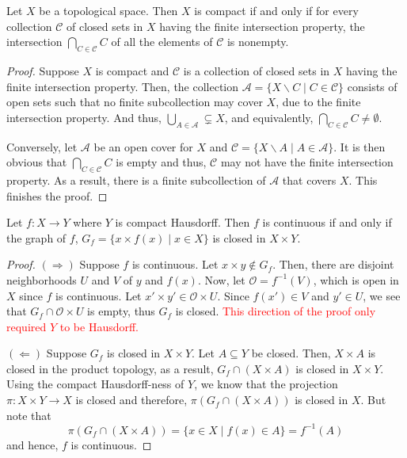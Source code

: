 \begin{theorem}
    Let $X$ be a topological space. Then $X$ is compact if and only if for every collection $\mathscr{C}$ of closed sets in $X$ having the finite intersection property, the intersection $\bigcap_{C\in\mathscr{C}} C$ of all the elements of $\mathscr{C}$ is nonempty.
\end{theorem}
\begin{proof}
    Suppose $X$ is compact and $\mathscr{C}$ is a collection of closed sets in $X$ having the finite intersection property. Then, the collection $\mathscr{A} = \{X\backslash C\mid C\in\mathscr{C}\}$ consists of open sets such that no finite subcollection may cover $X$, due to the finite intersection property. And thus, $\bigcup_{A\in\mathscr{A}}\subsetneq X$, and equivalently, $\bigcap_{C\in\mathscr{C}}C\ne\emptyset$.

    Conversely, let $\mathscr{A}$ be an open cover for $X$ and $\mathscr{C} = \{X\backslash A\mid A\in\mathscr{A}\}$. It is then obvious that $\bigcap_{C\in\mathscr{C}} C$ is empty and thus, $\mathscr{C}$ may not have the finite intersection property. As a result, there is a finite subcollection of $\mathscr{A}$ that covers $X$. This finishes the proof.
\end{proof}

\begin{lemma}
    Let $f: X\to Y$ where $Y$ is compact Hausdorff. Then $f$ is continuous if and only if the graph of $f$, $G_f = \{x\times f(x)\mid x\in X\}$ is closed in $X\times Y$.
\end{lemma}
\begin{proof}
$(\Longrightarrow)$ Suppose $f$ is continuous. Let $x\times y\notin G_f$. Then, there are disjoint neighborhoods $U$ and $V$ of $y$ and $f(x)$. Now, let $\mathcal O = f^{-1}(V)$, which is open in $X$ since $f$ is continuous. Let $x'\times y'\in\mathcal O\times U$. Since $f(x')\in V$ and $y'\in U$, we see that $G_f\cap\mathcal O\times U$ is empty, thus $G_f$ is closed. \textcolor{red}{This direction of the proof only required $Y$ to be Hausdorff.}

$(\Longleftarrow)$ Suppose $G_f$ is closed in $X\times Y$. Let $A\subseteq Y$ be closed. Then, $X\times A$ is closed in the product topology, as a result, $G_f\cap (X\times A)$ is closed in $X\times Y$. Using the compact Hausdorff-ness of $Y$, we know that the projection $\pi: X\times Y\to X$ is closed and therefore, $\pi(G_f\cap (X\times A))$ is closed in $X$. But note that 
\begin{equation*}
    \pi\left(G_f\cap(X\times A)\right) = \{x\in X\mid f(x)\in A\} = f^{-1}(A)
\end{equation*}
and hence, $f$ is continuous.
\end{proof}

